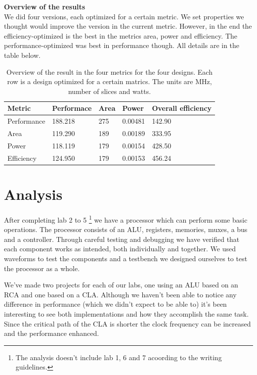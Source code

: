 \documentclass[a4paper,11pt]{article}
\begin{document}
\textbf{Overview of the results}\\
We did four versions, each optimized for a certain metric. We set properties we thought would improve the version in the current metric. However, in the end the efficiency-optimized is the best in the metrics area, power and efficiency. The performance-optimized was best in performance though. All details are in the table below.

\begin{table}[h!]
  \centering
  \begin{tabular}{|l||l|l|l|l|} \hline
  \textbf{Metric} & \textbf{Performace} & \textbf{Area} & \textbf{Power} & \textbf{Overall efficiency}  \\ \hline
  Performance & 188.218 & 275 & 0.00481 & 142.90 \\
  Area & 119.290 & 189 & 0.00189 & 333.95 \\
  Power & 118.119 & 179 & 0.00154 & 428.50 \\
  Efficiency & 124.950 & 179 & 0.00153 & 456.24\\ \hline
  \end{tabular}
  \caption{Overview of the result in the four metrics for the four designs. Each row is a design optimized for a certain matrics. The units are MHz, number of slices and watts.}
\end{table}

\newpage
\section{Analysis}

After completing lab 2 to 5 \footnote{The analysis doesn't include lab 1, 6 and 7 acoording to the writing guidelines.} we have a processor which can perform some basic operations. The processor consists of an ALU, registers, memories, muxes, a bus and a controller. Through careful testing and debugging we have verified that each component works as intended, both individually and together. We used waveforms to test the components and a testbench we designed ourselves to test the processor as a whole.

We've made two projects for each of our labs, one using an ALU based on an RCA and one based on a CLA. Although we haven't been able to notice any difference in performance (which we didn't expect to be able to) it's been interesting to see both implementations and how they accomplish the same task. Since the critical path of the CLA is shorter the clock frequency can be increased and the performance enhanced.
 
\end{document}
